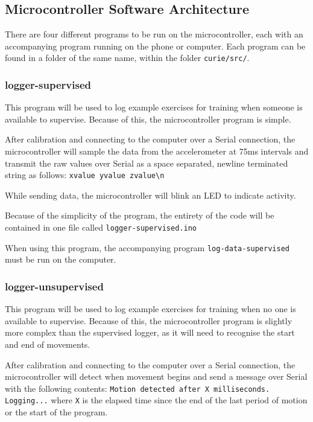 \documentclass[a4paper]{article}
\begin{document}

\subsection{Microcontroller Software Architecture}%

There are four different programs to be run on the microcontroller, each with an accompanying program running on the phone or computer. Each program can be found in a folder of the same name, within the folder \lstinline{curie/src/}.

\subsubsection{logger-supervised}

This program will be used to log example exercises for training when someone is available to supervise. Because of this, the microcontroller program is simple.

After calibration and connecting to the computer over a Serial connection, the microcontroller will sample the data from the accelerometer at 75ms intervals and transmit the raw values over Serial as a space separated, newline terminated string as follows:
\lstinline|xvalue yvalue zvalue\n|

While sending data, the microcontroller will blink an LED to indicate activity.

Because of the simplicity of the program, the entirety of the code will be contained in one file called \lstinline{logger-supervised.ino}

When using this program, the accompanying program \lstinline{log-data-supervised} must be run on the computer.

\subsubsection{logger-unsupervised}

This program will be used to log example exercises for training when no one is available to supervise. Because of this, the microcontroller program is slightly more complex than the supervised logger, as it will need to recognise the start and end of movements.

After calibration and connecting to the computer over a Serial connection, the microcontroller will detect when movement begins and send a message over Serial with the following contents: \lstinline{Motion detected after X milliseconds. Logging...} where \lstinline{X} is the elapsed time since the end of the last period of motion or the start of the program.
\end{document}
